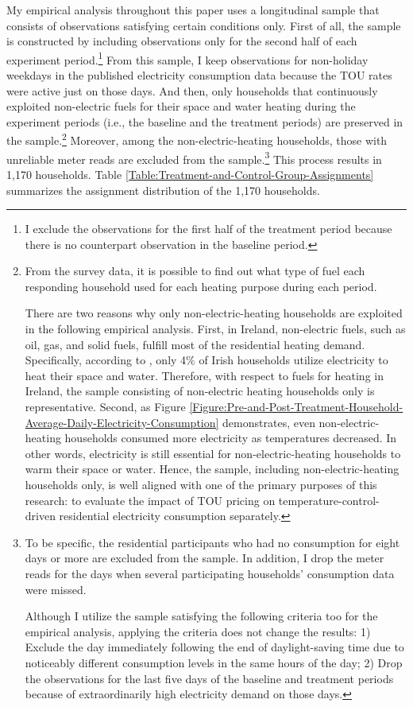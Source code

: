 My empirical analysis throughout this paper uses a longitudinal sample that consists of observations satisfying certain conditions only. First of all, the sample is constructed by including observations only for the second half of each experiment period.\footnote{I exclude the observations for the first half of the treatment period because there is no counterpart observation in the baseline period.} From this sample, I keep observations for non-holiday weekdays in the published electricity consumption data because the TOU rates were active just on those days. And then, only households that continuously exploited non-electric fuels for their space and water heating during the experiment periods (i.e., the baseline and the treatment periods) are preserved in the sample.\footnote{From the survey data, it is possible to find out what type of fuel each responding household used for each heating purpose during each period. \par
There are two reasons why only non-electric-heating households are exploited in the following empirical analysis. First, in Ireland, non-electric fuels, such as oil, gas, and solid fuels, fulfill most of the residential heating demand. Specifically, according to \cite{Heating-and-Cooling-in-Ireland-Today_SEAI_2022}, only 4\% of Irish households utilize electricity to heat their space and water. Therefore, with respect to fuels for heating in Ireland, the sample consisting of non-electric heating households only is representative. Second, as Figure \ref{Figure:Pre-and-Post-Treatment-Household-Average-Daily-Electricity-Consumption} demonstrates, even non-electric-heating households consumed more electricity as temperatures decreased. In other words, electricity is still essential for non-electric-heating households to warm their space or water. Hence, the sample, including non-electric-heating households only, is well aligned with one of the primary purposes of this research: to evaluate the impact of TOU pricing on temperature-control-driven residential electricity consumption separately.} Moreover, among the non-electric-heating households, those with unreliable meter reads are excluded from the sample.\footnote{To be specific, the residential participants who had no consumption for eight days or more are excluded from the sample. In addition, I drop the meter reads for the days when several participating households' consumption data were missed. \par
Although I utilize the sample satisfying the following criteria too for the empirical analysis, applying the criteria does not change the results: 1) Exclude the day immediately following the end of daylight-saving time due to noticeably different consumption levels in the same hours of the day; 2) Drop the observations for the last five days of the baseline and treatment periods because of extraordinarily high electricity demand on those days.} This process results in 1,170 households. Table \ref{Table:Treatment-and-Control-Group-Assignments} summarizes the assignment distribution of the 1,170 households.  

